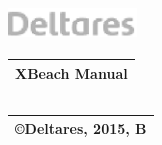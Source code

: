 \documentclass{article}
\begin{document}

\noindent 

\noindent 

\noindent 

\noindent 

\noindent \includegraphics*[width=1.34in, height=0.38in, keepaspectratio=false]{image1}

\noindent 

\noindent 

\noindent 

\noindent 

\noindent 

\noindent 

\noindent 

\noindent 

\noindent 

\noindent 

\noindent 

\noindent 

\noindent 

\noindent 

\noindent 

\begin{tabular}{|p{3.2in}|} \hline 
\textbf{XBeach Manual\newline \newline } \\ \hline 
\end{tabular}



\noindent 

\noindent 

\noindent 

\begin{tabular}{|p{3.9in}|} \hline 
 \\ \hline 
\end{tabular}



\noindent 

\noindent 

\noindent 

\begin{tabular}{|p{3.9in}|} \hline 
\copyright  Deltares, 2015, B \\ \hline 
\end{tabular}
\end{document}
